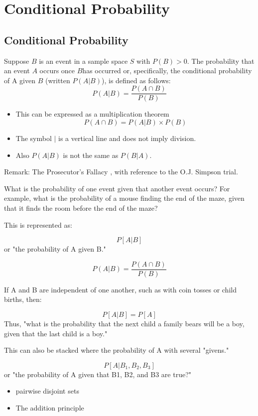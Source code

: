 \documentclass[]{report}
\begin{document}
\chapter{Conditional Probability}


\section{Conditional Probability}
Suppose $B$ is an event in a sample space $S$ with $P(B) > 0$.
The probability that an event $A$ occurs once $B$has occurred or, specifically, the
conditional probability of A given $B$ (written $P(A|B)$), is defined as follows:
\[ P(A|B) = \frac{P(A\cap B)}{P(B)}\]

\begin{itemize}
\item This can be expressed as a multiplication theorem
\[ P(A\cap B) = P(A|B)\times P(B) \]
\item The symbol $|$ is a vertical line and does not imply division.
\item Also $P(A|B)$ is not the same as $P(B|A)$.
\end{itemize}
Remark: The Prosecutor's Fallacy , with reference to the O.J. Simpson trial.


What is the probability of one event given that another event occurs? For example, what is the probability of a mouse finding the end of the maze, given that it finds the room before the end of the maze?

This is represented as:


\[P[A | B]\]
or "the probability of A given B."

\[P(A | B) = \frac{P(A\cap B)}{P(B)}\]

If A and B are independent of one another, such as with coin tosses or child births, then:


\[P[A | B] = P[ A ]\]
Thus, "what is the probability that the next child a family bears will be a boy, given that the last child is a boy."

This can also be stacked where the probability of A with several "givens."


\[P[A | B_1, B_2, B_3 ]\]
or "the probability of A given that B1, B2, and B3 are true?"



\begin{itemize}
\item pairwise disjoint sets
\item The addition principle
\end{itemize}
\end{document}

